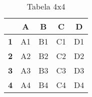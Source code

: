 \begin{table}[htbp]
    \centering
    \begin{tabular}{|c|c|c|c|c|}
\hline
\textbf{}  & \textbf{A} & \textbf{B} & \textbf{C} & \textbf{D} \\ 
\hline
\textbf{1} & A1         & B1         & C1         & D1         \\ 
\hline
\textbf{2} & A2         & B2         & C2         & D2         \\ 
\hline
\textbf{3} & A3         & B3         & C3         & D3         \\ 
\hline
\textbf{4} & A4         & B4         & C4         &D4 \\ 
\hline
\end{tabular}
    \caption{Tabela 4x4}
    \label{tab:tabela}
\end{table}
